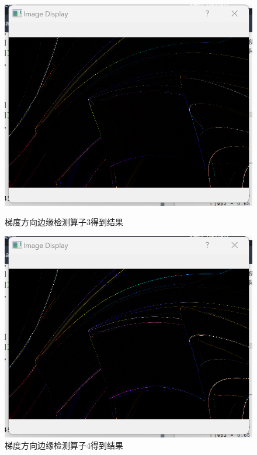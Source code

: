 \documentclass[a4paper,12pt]{article}
\begin{document}
\begin{figure}[htbp]
    \vspace{0.2cm}
    
    \begin{minipage}[b]{0.48\textwidth}
        \centering
        \includegraphics[width=\linewidth]{images/Design/image_processing/1/gradient7.png}
        \caption{梯度方向边缘检测算子3得到结果}
    \end{minipage}
    \hfill
    \begin{minipage}[b]{0.48\textwidth}
        \centering
        \includegraphics[width=\linewidth]{images/Design/image_processing/1/gradient8.png}
        \caption{梯度方向边缘检测算子4得到结果}
    \end{minipage}
\end{figure}
\end{document}
